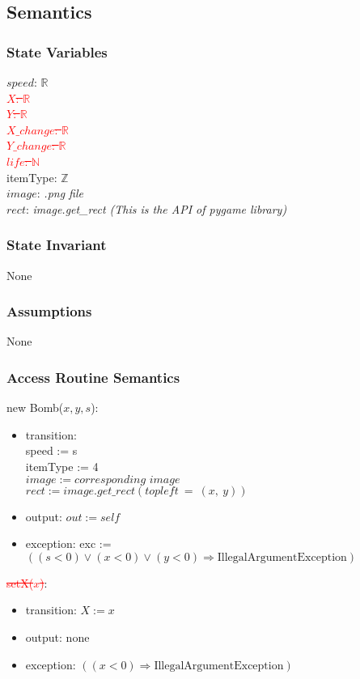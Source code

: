 \documentclass[12pt]{article}
\begin{document}
\subsection*{Semantics}
\subsubsection*{State Variables}
$\mathit{speed}$: $\mathbb{R}$\\
\textcolor{red}{\st{$\mathit{X}$: $\mathbb{R}$}}\\
\textcolor{red}{\st{$\mathit{Y}$: $\mathbb{R}$}}\\
\textcolor{red}{\st{$\mathit{X\_change}$: $\mathbb{R}$}}\\
\textcolor{red}{\st{$\mathit{Y\_change}$: $\mathbb{R}$}}\\
\textcolor{red}{\st{$\mathit{life}$: $\mathbb{N}$}}\\
itemType: $\mathbb{Z}$\\
$\mathit{image}$: \textit{.png file}\\
$\mathit{rect}$: \textit{image.get\_rect (This is the API of pygame library)}

\subsubsection*{State Invariant}
None
\subsubsection*{Assumptions}
None
\subsubsection*{Access Routine Semantics}
\noindent new Bomb($\mathit{x}, \mathit{y}, \mathit{s}$):
\begin{itemize}
\item transition: \\ speed := s\\ itemType := 4\\$image := \textit{corresponding image}$\\
 $rect := image.get\_rect(topleft\ =\ (x,\ y))$
\item output: $out := \mathit{self}$
\item exception: exc := $((\mathit{s} < 0) \vee (\mathit{x} < 0) \vee 
  (\mathit{y} < 0) \Rightarrow \text{IllegalArgumentException})$
\end{itemize}

\noindent \textcolor{red}{\st{setX($\mathit{x}$)}}:
\begin{itemize}
\item transition: $X := x$ 
\item output: none
\item exception: $((\mathit{x} < 0) \Rightarrow \text{IllegalArgumentException})$
\end{itemize}
\end{document}
